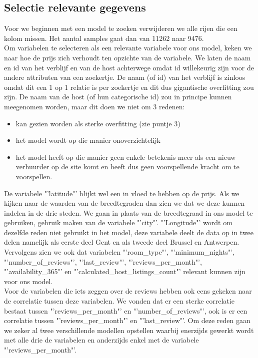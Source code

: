 \documentclass[a4paper,kulak]{kulakarticle} %
\begin{document}
\subsection{Selectie relevante gegevens}
\label{sec:huurprijsSelectie}
Voor we beginnen met een model te zoeken verwijderen we alle rijen die een kolom missen. Het aantal samples gaat dan van 11262 naar 9476.\\

Om variabelen te selecteren als een relevante variabele voor ons model, keken we naar hoe de prijs zich verhoudt ten opzichte van de variabele. We laten de naam en id van het verblijf en van de host achterwege omdat id willekeurig zijn voor de andere attributen van een zoekertje.
De naam (of id) van het verblijf is zinloos omdat dit een 1 op 1 relatie is per zoekertje en dit dus gigantische overfitting zou zijn.
De naam van de host (of hun categorische id) zou in principe kunnen meegenomen worden, maar dit doen we niet om 3 redenen:
\begin{itemize}
	\item kan gezien worden als sterke overfitting (zie puntje 3)
	\item het model wordt op die manier onoverzichtelijk 
	\item het model heeft op die manier geen enkele betekenis meer als een nieuw verhuurder op de site komt en heeft dus geen voorspellende kracht om te voorspellen. 
\end{itemize} 

De variabele "'latitude"' blijkt wel een in vloed te hebben op de prijs. Als we kijken naar de waarden van de breedtegraden dan zien we dat we deze kunnen indelen in de drie steden. We gaan in plaats van de breedtegraad in ons model te gebruiken, gebruik maken van de variabele "'city"'. "'Longitude"' wordt om dezelfde reden niet gebruikt in het model, deze variabele deelt de data op in twee delen namelijk als eerste deel Gent en als tweede deel Brussel en Antwerpen. Vervolgens zien we ook dat variabelen "'room\_type"', "'minimum\_nights"', "'number\_of\_reviews"', "'last\_review"', "'reviews\_per\_month"', "'availability\_365"' en "'calculated\_host\_listings\_count"' relevant kunnen zijn voor ons model. \\

Voor de variabelen die iets zeggen over de reviews hebben ook eens gekeken naar de correlatie tussen deze variabelen. We vonden dat er een sterke correlatie bestaat tussen "'reviews\_per\_month"' en "'number\_of\_reviews"', ook is er een correlatie tussen "'reviews\_per\_month"' en "'last\_review"'. Om deze reden gaan we zeker al twee verschillende modellen opstellen waarbij enerzijds gewerkt wordt met alle drie de variabelen en anderzijds enkel met de variabele "'reviews\_per\_month"'.\\
\end{document}

